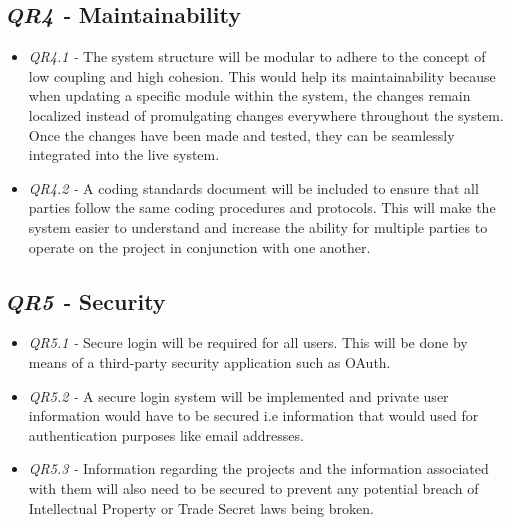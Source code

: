 \documentclass[11pt]{article}
\begin{document}
\subsection{\textit{QR4 -} Maintainability}
\begin{itemize}
    \item \textit{QR4.1 -} The system structure will be modular to adhere to the concept of low coupling and high cohesion. This would help its maintainability because when updating a specific module within the system, the changes remain localized instead of promulgating changes everywhere throughout the system. Once the changes have been made and tested, they can be seamlessly integrated into the live system.
    \item \textit{QR4.2 -} A coding standards document will be included to ensure that all parties follow the same coding procedures and protocols. This will make the system easier to understand and increase the ability for multiple parties to operate on the project in conjunction with one another.
\end{itemize}

\subsection{\textit{QR5 -} Security}
\begin{itemize}
    \item \textit{QR5.1 -} Secure login will be required for all users. This will be done by means of a third-party security application such as OAuth.
    \item \textit{QR5.2 -} A secure login system will be implemented and private user information would have to be secured i.e information that would used for authentication purposes like email addresses.
    \item \textit{QR5.3 -} Information regarding the projects and the information associated with them will also need to be secured to prevent any potential breach of Intellectual Property or Trade Secret laws being broken.

\end{itemize}

\newpage
\end{document}
